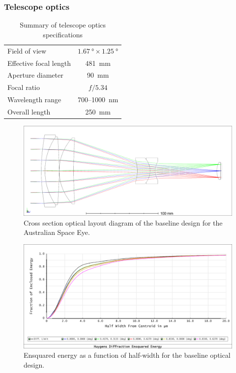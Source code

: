 \documentclass[]{iac}
\begin{document}
\subsubsection{Telescope optics}

\begin{table}[bp]
  \caption{Summary of telescope optics specifications}
  \label{tab:optics}
  \begin{center}
    \begin{tabular}{lc}
      \toprule \rule[-1ex]{0pt}{3.5ex} Field of view &  $\SI{1.67}{\degree} \times \SI{1.25}{\degree}$ \\
      \rule[-1ex]{0pt}{3.5ex} Effective focal length & \SI{481}{\milli\metre} \\
      \rule[-1ex]{0pt}{3.5ex} Aperture diameter & \SI{90}{\milli\metre} \\
      \rule[-1ex]{0pt}{3.5ex} Focal ratio & $f/5.34$ \\
      \rule[-1ex]{0pt}{3.5ex} Wavelength range & 700--\SI{1000}{\nano\metre} \\
      \rule[-1ex]{0pt}{3.5ex}  Overall length & \SI{250}{\milli\metre} \\
      \bottomrule
    \end{tabular}
  \end{center}
\end{table}

\begin{figure}[tp]
  \center \includegraphics[width=\columnwidth]{figures/spie-layout.png}
  \caption{\label{fig:optics}Cross section optical layout diagram of the baseline design for the Australian Space Eye.}
\end{figure}

\begin{figure}[tp]
  \center \includegraphics[width=\columnwidth]{figures/ensquared.png}
  \caption{\label{fig:ensquared}Ensquared energy as a function of half-width for the baseline optical design.}
\end{figure}
\end{document}
